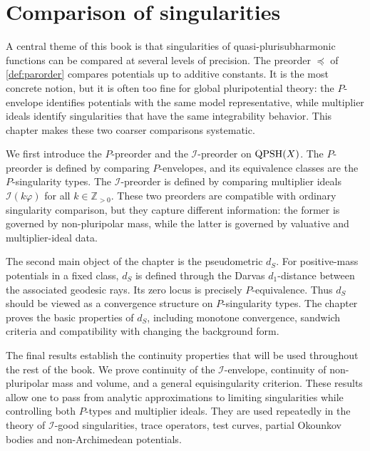 \chapter{Comparison of singularities}
\label{chap:comp}

A central theme of this book is that singularities of quasi-plurisubharmonic functions can be compared at several levels of precision. The preorder $\preceq$ of \cref{def:parorder} compares potentials up to additive constants. It is the most concrete notion, but it is often too fine for global pluripotential theory: the $P$-envelope identifies potentials with the same model representative, while multiplier ideals identify singularities that have the same integrability behavior. This chapter makes these two coarser comparisons systematic.

We first introduce the $P$-preorder and the $\mathcal I$-preorder on $\mathrm{QPSH}(X)$. The $P$-preorder is defined by comparing $P$-envelopes, and its equivalence classes are the $P$-singularity types. The $\mathcal I$-preorder is defined by comparing multiplier ideals $\mathcal I(k\varphi)$ for all $k\in\mathbb Z_{>0}$. These two preorders are compatible with ordinary singularity comparison, but they capture different information: the former is governed by non-pluripolar mass, while the latter is governed by valuative and multiplier-ideal data.

The second main object of the chapter is the pseudometric $d_S$. For positive-mass potentials in a fixed class, $d_S$ is defined through the Darvas $d_1$-distance between the associated geodesic rays. Its zero locus is precisely $P$-equivalence. Thus $d_S$ should be viewed as a convergence structure on $P$-singularity types. The chapter proves the basic properties of $d_S$, including monotone convergence, sandwich criteria and compatibility with changing the background form.

The final results establish the continuity properties that will be used throughout the rest of the book. We prove continuity of the $\mathcal I$-envelope, continuity of non-pluripolar mass and volume, and a general equisingularity criterion. These results allow one to pass from analytic approximations to limiting singularities while controlling both $P$-types and multiplier ideals. They are used repeatedly in the theory of $\mathcal I$-good singularities, trace operators, test curves, partial Okounkov bodies and non-Archimedean potentials.


